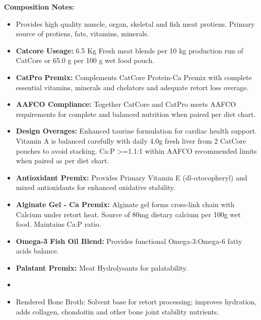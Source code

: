\noindent\textbf{Composition Notes:}
\begin{itemize}
\item{}Provides high quality muscle, organ, skeletal and fish meat protiens. Primary source of protiens, fats, vitamins, minerals. 
\item \textbf{Catcore Useage: }6.5 Kg Fresh meat blends per 10 kg production run of CatCore or 65.0 g per 100 g wet food pouch.
\item \textbf{CatPro Premix: } Complements CatCore Protein-Ca Premix with complete essential vitamins, minerals and chelators and adequate retort loss overage. 
\item\textbf{AAFCO Compliance: } Together CatCore and CatPro meets AAFCO requirements for complete and balanced nutrition when paired per diet chart. 
\item\textbf{Design Overages: }Enhanced taurine formulation for cardiac health support. Vitamin A is balanced carefully with daily 4.0g fresh liver from 2 CatCore pouches to avoid stacking. Ca:P >=1.1:1 within AAFCO recommended limits when paired  as per diet chart. 
\item \textbf{Antioxidant Premix: } Provides Primary Vitamin E (dl-$\alpha$tocopheryl) and mixed antioxidants for enhanced oxidative stability.
\item \textbf{Alginate Gel - Ca Premix:} Alginate gel forms cross-link chain with Calcium under retort heat. Source of 80mg dietary calcium per 100g wet food. Maintains Ca:P ratio. 
\item \textbf{Omega-3 Fish Oil Blend:} Provides functional Omega-3:Omega-6 fatty acids balance. 
\item \textbf{Palatant Premix: } Meat Hydrolysants for palatability.
\item\item{Rendered Bone Broth: } Solvent base for retort processing; improves hydration, adds collagen, chondoitin and other bone joint stability nutrients. 
\end{itemize}



